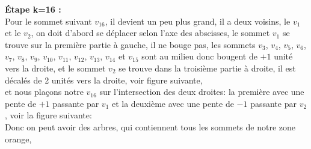 \documentclass[hidelinks,letterpaper,12pt]{article}
\begin{document}
\newpage
\textbf{Étape k=16 :}
\\
Pour le sommet suivant $v_{16}$, il devient un peu plus grand, il a deux voisins, le $v_1$ et le $v_2$,
on doit d'abord se déplacer selon l'axe des abscisses, 
le sommet $v_1$ se trouve sur la première partie à gauche, il ne bouge pas, 	
les sommets $v_3$, $v_4$, $v_5$, $v_6$, $v_7$, $v_8$, $v_9$, $v_{10}$, $v_{11}$, $v_{12}$, $v_{13}$, $v_{14}$ et $v_{15}$ sont au milieu donc bougent de $+1$ unité vers la droite,
et le sommet $v_2$ se trouve dans la troisième partie à droite, il est décalés de 2 unités vers la droite, voir figure suivante, \\
et nous plaçons notre $v_{16}$ sur l'intersection des deux droites: la première avec une pente de $+1$ passante par $v_1$ et la deuxième avec une pente de $-1$ passante par $v_2$, voir la figure suivante:
\\
Donc on peut avoir des arbres, qui contiennent tous les sommets de notre zone orange,
\end{document}
